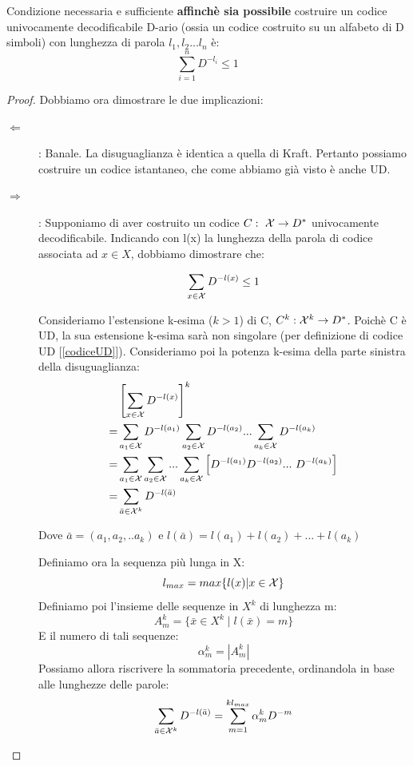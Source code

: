 \begin{teorema}
Condizione necessaria e sufficiente \textbf{affinchè sia possibile} costruire un codice univocamente decodificabile D-ario (ossia un codice costruito su un alfabeto di D simboli) con lunghezza di parola \(l_1, l_2 ... l_n\) è:
\[\sum_{i = 1}^n D^{-l_i} \leq 1\]
\label{macmillan} 

\begin{proof}
Dobbiamo ora dimostrare le due implicazioni:
\begin{description}
\item[\(\Longleftarrow\)]: 
Banale. La disuguaglianza è identica a quella di Kraft. Pertanto possiamo costruire un codice istantaneo, che come abbiamo già visto è anche UD.
\item[\(\Longrightarrow\)]:
Supponiamo di aver costruito un codice $C: \ \mathcal{X} \to D^*$ univocamente decodificabile.
Indicando con l(x) la lunghezza della parola di codice associata ad $x \in X$, dobbiamo dimostrare che:

\[\sum_{x \in \mathcal{X}} D^{-l(x)} \leq 1\]

Consideriamo l'estensione k-esima ($k>1$) di C, $C^k : \mathcal{X}^k \to D^*$.
Poichè C è UD, la sua estensione k-esima sarà non singolare (per definizione di codice UD [\ref{codiceUD}]).
Consideriamo poi la potenza k-esima della parte sinistra della disuguaglianza:
\[\begin{split}
&\left[ \sum_{x \in \mathcal{X}} D^{-l(x)} \right]^k \\
 =& \sum_{a_1 \in \mathcal{X}} D^{-l(a_1)} \sum_{a_2 \in \mathcal{X}} D^{-l(a_2)} ... \sum_{a_k \in \mathcal{X}} D^{-l(a_k)} \\
 =&\sum_{a_1 \in \mathcal{X}} \sum_{a_2 \in \mathcal{X}} ... \sum_{a_k \in \mathcal{X}} \left [ D^{-l(a_1)} D^{-l(a_2)} ... \ D^{-l(a_k)} \right ] \\
 =&\sum_{\bar{a} \in \mathcal{X}^k} D^{-l(\bar{a})}
\end{split}
\]

Dove $\bar{a}=(a_1,a_2,..a_k)$ e $l(\bar{a})=l(a_1)+l(a_2)+...+l(a_k)$

Definiamo ora la sequenza più lunga in X:
\[
 l_{max} = max \{l(x) | x \in \mathcal{X} \}
\]
Definiamo poi l'insieme delle sequenze in $X^k$ di lunghezza m:
\[
 A_m^k=\{ \bar{x} \in X^k \mid l(\bar{x})=m \}
\]
E il numero di tali sequenze:
\[
 {\alpha}_m^k=| A_m^k |
\]
Possiamo allora riscrivere la sommatoria precedente, ordinandola in base alle lunghezze delle parole:
\[
 \sum_{\bar{a} \in \mathcal{X}^k} D^{-l(\bar{a})}=\sum_{m=1}^{k l_{max}} {\alpha}_m^k D^{-m}
\]


\end{description}
\end{proof}
\end{teorema}
